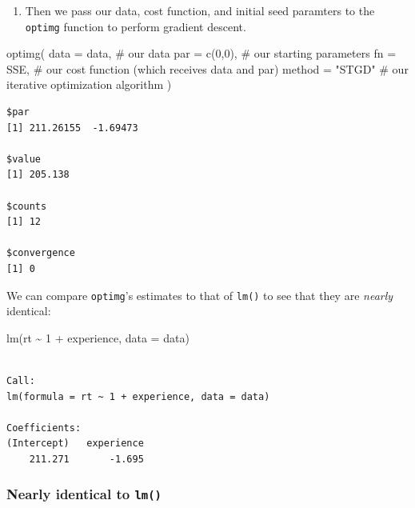 \documentclass[
  letterpaper,
  DIV=11,
  numbers=noendperiod]{scrartcl}
\newenvironment{Shaded}{}{}
\newcommand{\AttributeTok}[1]{\textcolor[rgb]{0.84,0.23,0.29}{#1}}
\newcommand{\CommentTok}[1]{\textcolor[rgb]{0.42,0.45,0.49}{#1}}
\newcommand{\DecValTok}[1]{\textcolor[rgb]{0.00,0.36,0.77}{#1}}
\newcommand{\FunctionTok}[1]{\textcolor[rgb]{0.44,0.26,0.76}{#1}}
\newcommand{\NormalTok}[1]{\textcolor[rgb]{0.14,0.16,0.18}{#1}}
\newcommand{\SpecialCharTok}[1]{\textcolor[rgb]{0.00,0.36,0.77}{#1}}
\newcommand{\StringTok}[1]{\textcolor[rgb]{0.01,0.18,0.38}{#1}}
\providecommand{\tightlist}{%
  \setlength{\itemsep}{0pt}\setlength{\parskip}{0pt}}\usepackage{longtable,booktabs,array}
\begin{document}
\begin{enumerate}
\def\labelenumi{\arabic{enumi}.}
\setcounter{enumi}{1}
\tightlist
\item
  Then we pass our data, cost function, and initial seed paramters to
  the \texttt{optimg} function to perform gradient descent.
\end{enumerate}

\begin{Shaded}
\begin{Highlighting}[]
\FunctionTok{optimg}\NormalTok{(}
    \AttributeTok{data =}\NormalTok{ data,  }\CommentTok{\# our data}
    \AttributeTok{par =} \FunctionTok{c}\NormalTok{(}\DecValTok{0}\NormalTok{,}\DecValTok{0}\NormalTok{), }\CommentTok{\# our starting parameters}
    \AttributeTok{fn =}\NormalTok{ SSE,     }\CommentTok{\# our cost function (which receives data and par)}
    \AttributeTok{method =} \StringTok{"STGD"} \CommentTok{\# our iterative optimization algorithm }
\NormalTok{    )}
\end{Highlighting}
\end{Shaded}

\begin{verbatim}
$par
[1] 211.26155  -1.69473

$value
[1] 205.138

$counts
[1] 12

$convergence
[1] 0
\end{verbatim}

We can compare \texttt{optimg}'s estimates to that of \texttt{lm()} to
see that they are \emph{nearly} identical:

\begin{Shaded}
\begin{Highlighting}[]
\FunctionTok{lm}\NormalTok{(rt }\SpecialCharTok{\textasciitilde{}} \DecValTok{1} \SpecialCharTok{+}\NormalTok{ experience, }\AttributeTok{data =}\NormalTok{ data) }
\end{Highlighting}
\end{Shaded}

\begin{verbatim}

Call:
lm(formula = rt ~ 1 + experience, data = data)

Coefficients:
(Intercept)   experience  
    211.271       -1.695  
\end{verbatim}

\subsubsection{\texorpdfstring{Nearly identical to
\texttt{lm()}}{Nearly identical to lm()}}\label{nearly-identical-to-lm}
\end{document}
